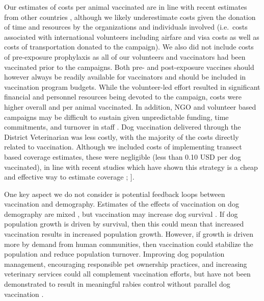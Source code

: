 \documentclass[tropicalmed,article,submit,moreauthors,pdftex]{mdpi}
\begin{document}
Our estimates of costs per animal vaccinated are in line with recent
estimates from other countries \citep{undurraga2020}, although we likely
underestimate costs given the donation of time and resources by the
organizations and individuals involved (i.e.~costs associated with
international volunteers including airfare and visa costs as well as
costs of transportation donated to the campaign). We also did not
include costs of pre-exposure prophylaxis as all of our volunteers and
vaccinators had been vaccinated prior to the campaigns. Both pre- and
post-exposure vaccines should however always be readily available for
vaccinators and should be included in vaccination program budgets. While
the volunteer-led effort resulted in significant financial and personnel
resources being devoted to the campaign, costs were higher overall and
per animal vaccinated. In addition, NGO and volunteer based campaigns
may be difficult to sustain given unpredictable funding, time
commitments, and turnover in staff \citep{ferguson2020}. Dog vaccination
delivered through the District Veterinarian was less costly, with the
majority of the costs directly related to vaccination. Although we
included costs of implementing transect based coverage estimates, these
were negligible (less than 0.10 USD per dog vaccinated), in line with
recent studies which have shown this strategy is a cheap and effective
way to estimate coverage \citet{sambo2017}; \citet{gibson2015}{]}.

One key aspect we do not consider is potential feedback loops between
vaccination and demography. Estimates of the effects of vaccination on
dog demography are mixed \citep{czupryna2016}, but vaccination may
increase dog survival \citep{conan2015}. If dog population growth is
driven by survival, then this could mean that increased vaccination
results in increased population growth. However, if growth is driven
more by demand from human communities, then vaccination could stabilize
the population and reduce population turnover. Improving dog population
management, encouraging responsible pet ownership practices, and
increasing veterinary services could all complement vaccination efforts,
but have not been demonstrated to result in meaningful rabies control
without parallel dog vaccination \citep{taylor2017}.
\end{document}
